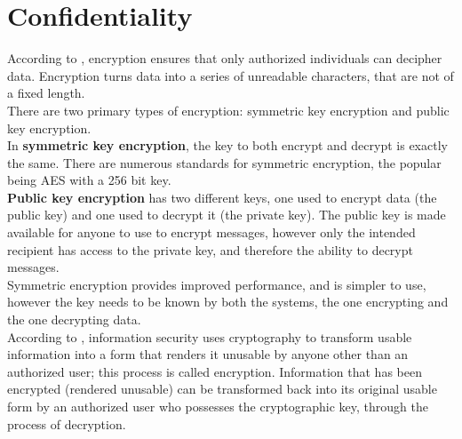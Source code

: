 \section{Confidentiality}
According to \cite{HashingVsEncrypting}, encryption ensures that only authorized individuals can decipher data. Encryption turns data into a series of unreadable characters, that are not of a fixed length.\\
There are two primary types of encryption: symmetric key encryption and public key encryption.\\
In \textbf{symmetric key encryption}, the key to both encrypt and decrypt is exactly the same. There are numerous standards for symmetric encryption, the popular being AES with a 256 bit key.\\
\textbf{Public key encryption} has two different keys, one used to encrypt data (the public key) and one used to decrypt it (the private key). The public key is made available for anyone to use to encrypt messages, however only the intended recipient has access to the private key, and therefore the ability to decrypt messages.\\
Symmetric encryption provides improved performance, and is simpler to use, however the key needs to be known by both the systems, the one encrypting and the one decrypting data.\\
According to \cite{InformationSecurity_Wikipedia}, information security uses cryptography to transform usable information into a form that renders it unusable by anyone other than an authorized user; this process is called encryption. Information that has been encrypted (rendered unusable) can be transformed back into its original usable form by an authorized user who possesses the cryptographic key, through the process of decryption. 
%
